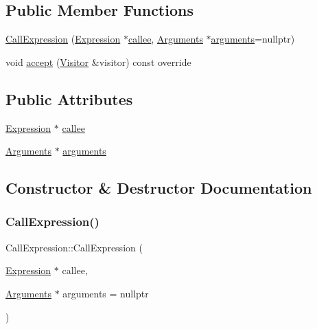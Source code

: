\subsection*{Public Member Functions}
\begin{DoxyCompactItemize}
\item 
\hyperlink{struct_call_expression_a7e6da0437a5f82430af5f31779b830d7}{Call\+Expression} (\hyperlink{struct_expression}{Expression} $\ast$\hyperlink{struct_call_expression_a2d77ccd1a2d6f34d718063f0eb47bc21}{callee}, \hyperlink{struct_arguments}{Arguments} $\ast$\hyperlink{struct_call_expression_ad2dad57df529ef1ef06b43cd438598bd}{arguments}=nullptr)
\item 
void \hyperlink{struct_call_expression_a5be626b61944a97f2a6015b632432513}{accept} (\hyperlink{struct_visitor}{Visitor} \&visitor) const override
\end{DoxyCompactItemize}
\subsection*{Public Attributes}
\begin{DoxyCompactItemize}
\item 
\hyperlink{struct_expression}{Expression} $\ast$ \hyperlink{struct_call_expression_a2d77ccd1a2d6f34d718063f0eb47bc21}{callee}
\item 
\hyperlink{struct_arguments}{Arguments} $\ast$ \hyperlink{struct_call_expression_ad2dad57df529ef1ef06b43cd438598bd}{arguments}
\end{DoxyCompactItemize}


\subsection{Constructor \& Destructor Documentation}
\mbox{\label{struct_call_expression_a7e6da0437a5f82430af5f31779b830d7}} 
\subsubsection{\texorpdfstring{Call\+Expression()}{CallExpression()}}
{\footnotesize\ttfamily Call\+Expression\+::\+Call\+Expression (\begin{DoxyParamCaption}\item[{\hyperlink{struct_expression}{Expression} $\ast$}]{callee,  }\item[{\hyperlink{struct_arguments}{Arguments} $\ast$}]{arguments = {\ttfamily nullptr} }\end{DoxyParamCaption})\hspace{0.3cm}{\ttfamily [inline]}}



